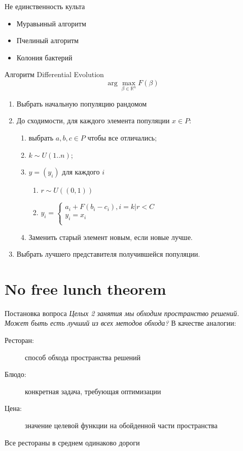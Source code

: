 \documentclass[14pt, fleqn, xcolor={dvipsnames, table}]{beamer}
\begin{document}
\begin{frame}{Не единственность культа}
\begin{itemize}
  \item Муравьиный алгоритм
  \item Пчелиный алгоритм
  \item Колония бактерий
\end{itemize}
\end{frame}


\begin{frame}{Алгоритм Differential Evolution}
$$
\arg\max_{\beta \in \mathbb{R}^n} F(\beta)
$$


\begin{enumerate}
  \item Выбрать начальную популяцию рандомом
  \item До сходимости, для каждого элемента популяции $x \in P$:
  \begin{enumerate}
    \item выбрать $a, b, c \in P$ чтобы все отличались;
    \item $k \sim U(1..n)$;
    \item $y = (y_i)$ для каждого $i$
    \begin{enumerate}
      \item $r \sim U((0,1))$
      \item $y_i = \left\{ \begin{array}{ll} a_i + F(b_i - c_i), i =k | r < C \\ y_i = x_i \\ \end{array} \right. $
    \end{enumerate}
    \item Заменить старый элемент новым, если новые лучше.
  \end{enumerate}
  \item Выбрать лучшего представителя получившейся популяции.
\end{enumerate}
\end{frame}

\section{No free lunch theorem}
\begin{frame}{Постановка вопроса}
\textit{Целых 2 занятия мы обходим пространство решений. Может быть есть лучший из всех методов обхода?}
В качестве аналогии:
\begin{description}
  \item[Ресторан:] способ обхода пространства решений
  \item[Блюдо:] конкретная задача, требующая оптимизации
  \item[Цена:] значение целевой функции на обойденной части пространства
\end{description}
\begin{theorem}
Все рестораны в среднем одинаково дороги
\end{theorem}
\end{frame}
\end{document}
